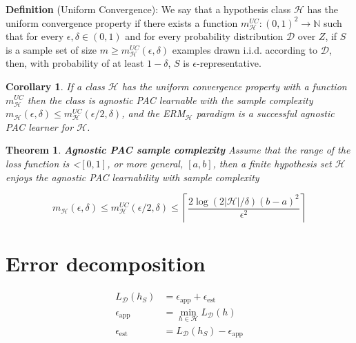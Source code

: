 \documentclass{article}
\newtheorem{theorem}{Theorem}
\newtheorem{corollary}{Corollary}
\begin{document}
\noindent\textbf{Definition} (Uniform Convergence): We say that a hypothesis class $\mathcal{H}$ has the uniform convergence property if there exists a function $m^{UC}_\mathcal{H}:(0,1)^2\rightarrow \mathbb{N}$ such that for every $\epsilon,\delta \in (0, 1)$ and for every probability distribution $\mathcal{D}$ over $Z$, if $S$ is a sample set of size $m\geq m^{UC}_\mathcal{H}(\epsilon, \delta)$ examples drawn i.i.d. according to $\mathcal{D}$, then, with probability of at least $1-\delta$, $S$ is $\epsilon$-representative.

	\begin{corollary}
	If a class $\mathcal{H}$ has the uniform convergence property with a function $m^{UC}_\mathcal{H}$ then the class is agnostic PAC learnable with the sample complexity $m_\mathcal{H}(\epsilon,\delta)\leq m^{UC}_\mathcal{H}(\epsilon/2,\delta)$, and the ERM$_\mathcal{H}$ paradigm is a successful agnostic PAC learner for $\mathcal{H}$.
	\end{corollary}

	\begin{theorem}
	\textbf{Agnostic PAC sample complexity} Assume that the range of the loss function is <$[0,1]$, or more general, $[a,b]$, then a finite hypothesis set $\mathcal{H}$ enjoys the agnostic PAC learnability with sample complexity 
	
	\begin{equation}
	m_\mathcal{H}(\epsilon,\delta)\leq m^{UC}_\mathcal{H}(\epsilon/2,\delta)\leq\left\lceil\frac{2\log(2|\mathcal{H}|/\delta)(b-a)^2}{\epsilon^2}\right\rceil
	\end{equation}
	\end{theorem}

\section{Error decomposition}

	\begin{equation}
	\begin{split}
	L_\mathcal{D}(h_S) &= \epsilon_{\mathrm{app}}+\epsilon_{\mathrm{est}} \\
	\epsilon_{\mathrm{app}} &= \min\limits_{h\in\mathcal{H}}L_\mathcal{D}(h) \\
	\epsilon_{\mathrm{est}} &= L_\mathcal{D}(h_S)-\epsilon_{\mathrm{app}}
	\end{split}
	\end{equation}		
\end{document}
